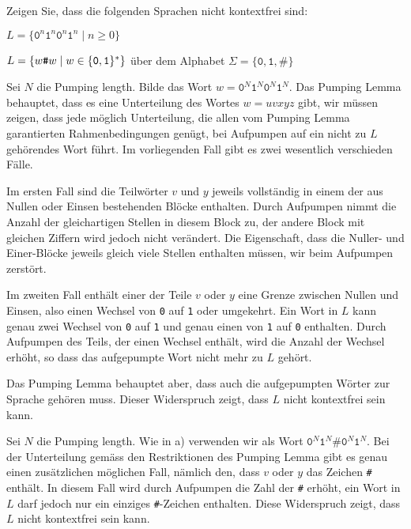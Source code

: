 Zeigen Sie, dass die folgenden Sprachen nicht kontextfrei sind:
\begin{teilaufgaben}
\item $L=\{\texttt{0}^n\texttt{1}^n\texttt{0}^n\texttt{1}^n\;|\;n\ge 0\}$
\item $L=\{w{\texttt{\#}}w\;|\;w\in\{{\tt 0},{\tt 1}\}^*\}$ über dem Alphabet
$\Sigma=\{\texttt{0},\texttt{1},\texttt{\#}\}$
\end{teilaufgaben}


\begin{loesung}
\begin{teilaufgaben}
\item Sei $N$ die Pumping length.
Bilde das Wort $w=\texttt{0}^N\texttt{1}^N\texttt{0}^N\texttt{1}^N$.
Das Pumping Lemma
behauptet, dass es eine Unterteilung des Wortes $w=uvxyz$ gibt, wir
müssen zeigen, dass jede möglich Unterteilung, die allen vom
Pumping Lemma garantierten Rahmenbedingungen genügt, bei Aufpumpen
auf ein nicht zu $L$ gehörendes Wort führt.
Im vorliegenden Fall
gibt es zwei wesentlich verschieden Fälle.

Im ersten Fall sind die
Teilwörter $v$ und $y$ jeweils vollständig in einem der aus Nullen
oder Einsen bestehenden Blöcke enthalten. Durch Aufpumpen nimmt die
Anzahl der gleichartigen Stellen in diesem Block zu, der andere Block
mit gleichen Ziffern wird jedoch nicht verändert.
Die Eigenschaft, dass die Nuller- und
Einer-Blöcke jeweils gleich viele Stellen enthalten müssen, wir
beim Aufpumpen zerstört.

Im zweiten Fall enthält einer der Teile $v$ oder $y$ eine
Grenze zwischen Nullen und Einsen, also einen Wechsel von
\texttt{0} auf \texttt{1} oder umgekehrt.
Ein Wort in $L$ kann
genau zwei Wechsel von \texttt{0} auf \texttt{1} und genau einen
von \texttt{1} auf \texttt{0} enthalten.
Durch Aufpumpen des Teils,
der einen Wechsel enthält, wird die Anzahl der Wechsel erhöht,
so dass das aufgepumpte Wort nicht mehr zu $L$ gehört.

Das Pumping Lemma behauptet aber, dass auch die aufgepumpten Wörter
zur Sprache gehören muss. Dieser Widerspruch zeigt, dass $L$
nicht kontextfrei sein kann.
\item Sei $N$ die Pumping length. Wie in a) verwenden wir als
Wort $\texttt{0}^N\texttt{1}^N\texttt{\#}\texttt{0}^N\texttt{1}^N$.
Bei der Unterteilung
gemäss den Restriktionen des Pumping Lemma gibt es genau einen zusätzlichen
möglichen Fall, nämlich den, dass $v$ oder $y$ das Zeichen {\tt\#}
enthält.
In diesem Fall wird durch Aufpumpen die Zahl der {\tt\#}
erhöht, ein Wort in $L$ darf jedoch nur ein einziges {\tt\#}-Zeichen
enthalten.
Diese Widerspruch zeigt, dass $L$ nicht kontextfrei sein kann.
\qedhere
\end{teilaufgaben}
\end{loesung}
